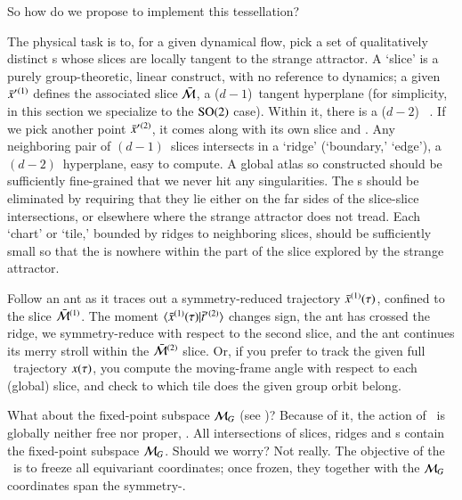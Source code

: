 \documentclass[preprint,12pt]{elsarticle} %
\begin{document}
So how do we propose to implement this tessellation?

The physical task is to, for a given dynamical flow, pick a set of
qualitatively distinct {\template s} whose slices are locally tangent to
the strange attractor. A `slice' is a purely group-theoretic, linear
construct, with no reference to dynamics; a given {\template}
$\bar{x}'{}^{(1)}$ defines the associated slice $\bar{\cal M}$, a
($d\!-\!1$)\dmn\ tangent hyperplane (for simplicity, in this section we
specialize to the $\textrm{SO}(2)$ case). Within it, there is a ($d\!-\!2$)\dmn\
{\sset} . If we pick another {\template} point
$\bar{x}'{}^{(2)}$, it comes along with its own slice and {\sset}. Any
neighboring pair of $(d\!-\!1)$\dmn\ slices intersects in a `ridge'
(`boundary,' `edge'), a $(d\!-\!2)$\dmn\ hyperplane, easy to compute.
A global atlas so constructed should be sufficiently
fine-grained that we never hit any {\sset} singularities. The {\sset}s
should be eliminated by requiring that they lie either on the far sides
of the slice-slice intersections, or elsewhere where the strange
attractor does not tread. Each `chart' or `tile,' bounded by ridges to
neighboring slices, should be sufficiently small so that the {\sset} is
nowhere within the part of the slice explored by the strange attractor.

Follow an ant as it traces out a symmetry-reduced trajectory
$\bar{x}{}^{(1)}(\tau)$, confined to the slice $\bar{\cal M}{}^{(1)}$. The
moment $\braket{\sspRed{}^{(1)}(\tau)}{\sliceTan{}{}^{(2)}}$ changes
sign, the ant has crossed the ridge, we symmetry-reduce with respect to
the second slice, and the ant continues its merry stroll within the
$\bar{\cal M}{}^{(2)}$ slice. Or, if you prefer to track the  given full
\statesp\ trajectory $x(\tau)$, you compute the moving-frame angle
with respect to each (global) slice, and check to which tile does the
given group orbit belong.

What about the fixed-point subspace ${\cal M}_{G}$ (see )?
Because of it, the action of \Group\ is globally neither free nor proper,
\etc. All intersections of slices, ridges and {\sset s} contain the
fixed-point subspace ${\cal M}_{G}$. Should we worry? Not really. The
objective of the \mslices\ is to freeze all equivariant coordinates; once
frozen, they together with the  ${\cal M}_{G}$ coordinates span the
symmetry-\reducedsp.
\end{document}

